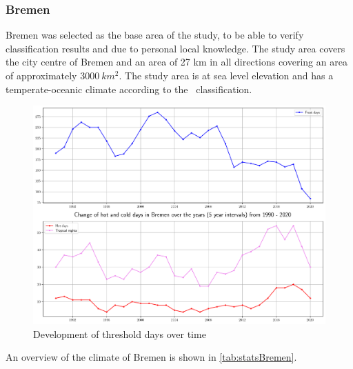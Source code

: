 \documentclass[12pt,a4paper, english,twoside]{article}
\begin{document}
  \subsubsection{Bremen}
  Bremen was selected as the base area of the study, to be able to verify classification results and due to personal local knowledge. 
  The study area covers the city centre of Bremen and an area of 27 km in all directions covering an area of approximately $3000\ km^2$. 
  The study area is at sea level elevation and has a temperate-oceanic climate according to the~\autocite{koppen1930handbuch} classification.%
    \begin{figure}[!htbp]
     \centering
        \includegraphics[width=\textwidth]{img/BremenKIChanges}
        \caption{Development of threshold days over time\label{fig:climateovertimeBremen}}
   \end{figure}
   An overview of the climate of Bremen is shown in \cref{tab:statsBremen}.
\end{document}
